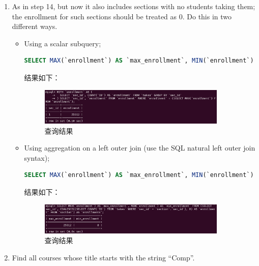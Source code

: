 \documentclass{article}
\begin{document}
\begin{enumerate}
\item As in step 14, but now it also includes sections with no students taking them; the enrollment for such sections should be treated as 0. Do this in two different ways.
\begin{itemize}
  \item Using a scalar subquery;
  \begin{lstlisting}[language=sql]
SELECT MAX(`enrollment`) AS `max_enrollment`, MIN(`enrollment`) AS `min_enrollment` FROM (SELECT `sec_id`, COALESCE((SELECT COUNT(`ID`) FROM `takes` WHERE `sec_id` = `section`.`sec_id`), 0) AS `enrollment` FROM `section`) AS `enrollments`;
  \end{lstlisting}

  结果如下：

  \begin{figure}[H]
  \centering
  \includegraphics[width=0.9\textwidth]{img/21.png}
  \caption{查询结果}
  \end{figure}

  \item Using aggregation on a left outer join (use the SQL natural left outer join syntax);
  
  \begin{lstlisting}[language=sql]
SELECT MAX(`enrollment`) AS `max_enrollment`, MIN(`enrollment`) AS `min_enrollment` FROM (SELECT `sec_id`, COUNT(`ID`) AS `enrollment` FROM `section` NATURAL LEFT JOIN `takes` GROUP BY `sec_id`) AS `enrollments`;
  \end{lstlisting}

  结果如下：

  \begin{figure}[H]
  \centering
  \includegraphics[width=0.9\textwidth]{img/22.png}
  \caption{查询结果}
  \end{figure}

\end{itemize}

\item Find all courses whose title starts with the string “Comp”.


\end{enumerate}
\end{document}
